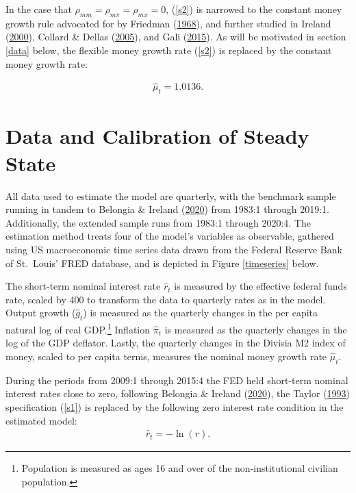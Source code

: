 \documentclass[11pt,preprint, authoryear]{elsarticle}
\numberwithin{equation}{section}
\numberwithin{figure}{section}
\numberwithin{table}{section}
\let\rmarkdownfootnote\footnote%
\def\footnote{\protect\rmarkdownfootnote}
\begin{document}
In the case that \(\rho_{mm} = \rho_{m \pi}= \rho_{mx}=0\), (\ref{s2})
is narrowed to the constant money growth rule advocated for by Friedman
(\protect\hyperlink{ref-friedman1968}{1968}), and further studied in
Ireland (\protect\hyperlink{ref-ireland2000}{2000}), Collard \& Dellas
(\protect\hyperlink{ref-collard2005}{2005}), and Gali
(\protect\hyperlink{ref-gali2015}{2015}). As will be motivated in
section \ref{data} below, the flexible money growth rate (\ref{s2}) is
replaced by the constant money growth rate:

\begin{align}
\hat{\mu}_t = 1.0136. \label{s3}
\end{align}

\hypertarget{data-and-calibration-of-steady-state}{%
\section{\texorpdfstring{Data and Calibration of Steady State
\label{data}}{Data and Calibration of Steady State }}\label{data-and-calibration-of-steady-state}}

All data used to estimate the model are quarterly, with the benchmark
sample running in tandem to Belongia \& Ireland
(\protect\hyperlink{ref-belongia2020}{2020}) from 1983:1 through 2019:1.
Additionally, the extended sample runs from 1983:1 through 2020:4. The
estimation method treats four of the model's variables as observable,
gathered using US macroeconomic time series data drawn from the Federal
Reserve Bank of St.~Louis' FRED database, and is depicted in Figure
\ref{timeseries} below.

The short-term nominal interest rate \(\hat{r}_t\) is measured by the
effective federal funds rate, scaled by 400 to transform the data to
quarterly rates as in the model. Output growth (\(\hat{g}_t\)) is
measured as the quarterly changes in the per capita natural log of real
GDP.\footnote{Population is measured as ages 16 and over of the
  non-institutional civilian population.} Inflation \(\hat{\pi}_t\) is
measured as the quarterly changes in the log of the GDP deflator.
Lastly, the quarterly changes in the Divisia M2 index of money, scaled
to per capita terms, measures the nominal money growth rate
\(\hat{\mu}_t\).

During the periods from 2009:1 through 2015:4 the FED held short-term
nominal interest rates close to zero, following Belongia \& Ireland
(\protect\hyperlink{ref-belongia2020}{2020}), the Taylor
(\protect\hyperlink{ref-taylor1993}{1993}) specification (\ref{s1}) is
replaced by the following zero interest rate condition in the estimated
model: \begin{align}
\hat{r}_t = - \ln(r). \label{67}
\end{align}
\end{document}
